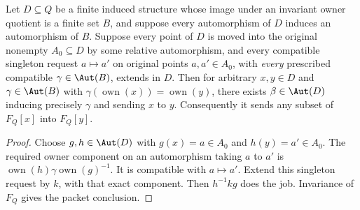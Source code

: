 \begin{lemma}
\label{lem:acf-point-homogeneity}
Let \(D\subseteq Q\) be a finite induced structure whose image
under an invariant owner quotient is a finite set \(B\), and
suppose every automorphism of \(D\) induces an automorphism of \(B\).
Suppose every point of \(D\) is moved into the original
nonempty \(A_0\subseteq D\) by some relative
automorphism, and every compatible singleton request
\(a\mapsto a'\) on original points \(a,a'\in A_0\),
with \emph{every} prescribed compatible
\(\gamma\in\Aut(B)\), extends in \(D\).
Then for arbitrary \(x,y\in D\) and
\(\gamma\in\Aut(B)\) with
\(\gamma(\operatorname{own}(x))=\operatorname{own}(y)\),
there exists \(\beta\in\Aut(D)\) inducing precisely
\(\gamma\) and sending \(x\) to \(y\).
Consequently it sends any subset of \(F_Q[x]\)
into \(F_Q[y]\).
\end{lemma}
\begin{proof}
Choose \(g,h\in\Aut(D)\) with
\(g(x)=a\in A_0\) and \(h(y)=a'\in A_0\).
The required owner component on an automorphism
taking \(a\) to \(a'\) is
\(\operatorname{own}(h)\gamma
          \operatorname{own}(g)^{-1}\).
It is compatible with \(a\mapsto a'\).
Extend this singleton request by \(k\), with
that exact component.  Then \(h^{-1}kg\)
does the job.  Invariance of \(F_Q\) gives
the packet conclusion.
\end{proof}

